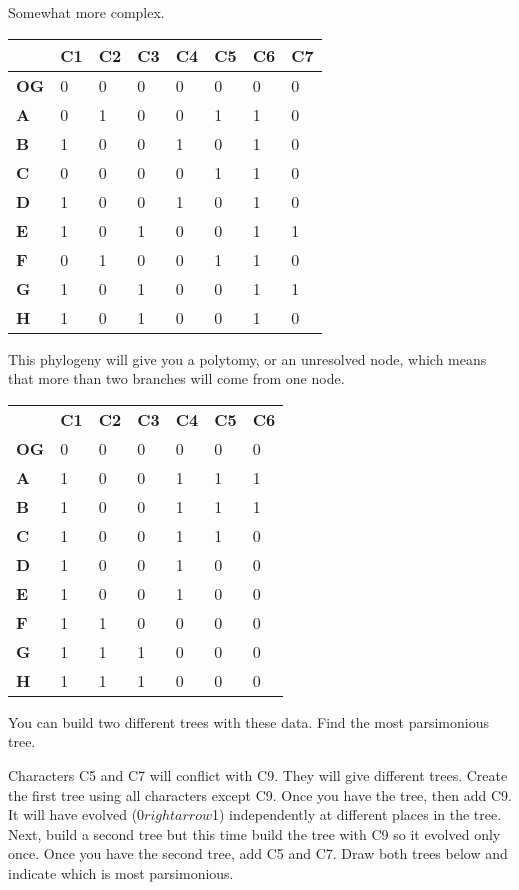 \documentclass[11pt, addpoints, hidelinks]{exam}
\newcommand*\AnswerBox[2]{%
	\parbox[t][#1]{0.92\textwidth}{%
		\begin{solution}#2\end{solution}}
	\vspace{\stretch{1}}
}
\begin{document}
\begin{questions}
\newpage

\question[3]
Somewhat more complex.

\begin{longtable}[l]{@{}llllllll@{}}
\toprule
& \textbf{C1} & \textbf{C2} & \textbf{C3} & \textbf{C4} & \textbf{C5} &
\textbf{C6} & \textbf{C7}\tabularnewline
\midrule
\endhead
\textbf{OG} & 0 & 0 & 0 & 0 & 0 & 0 & 0\tabularnewline
\textbf{A} & 0 & 1 & 0 & 0 & 1 & 1 & 0\tabularnewline
\textbf{B} & 1 & 0 & 0 & 1 & 0 & 1 & 0\tabularnewline
\textbf{C} & 0 & 0 & 0 & 0 & 1 & 1 & 0\tabularnewline
\textbf{D} & 1 & 0 & 0 & 1 & 0 & 1 & 0\tabularnewline
\textbf{E} & 1 & 0 & 1 & 0 & 0 & 1 & 1\tabularnewline
\textbf{F} & 0 & 1 & 0 & 0 & 1 & 1 & 0\tabularnewline
\textbf{G} & 1 & 0 & 1 & 0 & 0 & 1 & 1\tabularnewline
\textbf{H} & 1 & 0 & 1 & 0 & 0 & 1 & 0\tabularnewline
\bottomrule
\end{longtable}

\AnswerBox{0.2\textheight}{}

\question[3]
This phylogeny will give you a polytomy, or an unresolved
node, which means that more than two branches will come from one node.

\begin{longtable}[l]{@{}lllllll@{}}
\toprule
\endhead
& \textbf{C1} & \textbf{C2} & \textbf{C3} & \textbf{C4} & \textbf{C5} &
\textbf{C6}\tabularnewline
\textbf{OG} & 0 & 0 & 0 & 0 & 0 & 0\tabularnewline
\textbf{A} & 1 & 0 & 0 & 1 & 1 & 1\tabularnewline
\textbf{B} & 1 & 0 & 0 & 1 & 1 & 1\tabularnewline
\textbf{C} & 1 & 0 & 0 & 1 & 1 & 0\tabularnewline
\textbf{D} & 1 & 0 & 0 & 1 & 0 & 0\tabularnewline
\textbf{E} & 1 & 0 & 0 & 1 & 0 & 0\tabularnewline
\textbf{F} & 1 & 1 & 0 & 0 & 0 & 0\tabularnewline
\textbf{G} & 1 & 1 & 1 & 0 & 0 & 0\tabularnewline
\textbf{H} & 1 & 1 & 1 & 0 & 0 & 0\tabularnewline
\bottomrule
\end{longtable}

\AnswerBox{0.1\textheight}{}

\newpage

\question[3]
You can build two different trees with these data. Find the most parsimonious tree.

Characters C5 and C7 will conflict with C9. They will give different
trees. Create the first tree using all characters except C9. Once
you have the tree, then add C9. It will have evolved (0$rightarrow$1) 
independently at different places in the tree. Next, build a 
second tree but this time build the tree with C9 so it evolved only once.
Once you have the second tree, add C5 and C7. Draw both trees below and indicate which 
is most parsimonious.


\end{questions}
\end{document}
